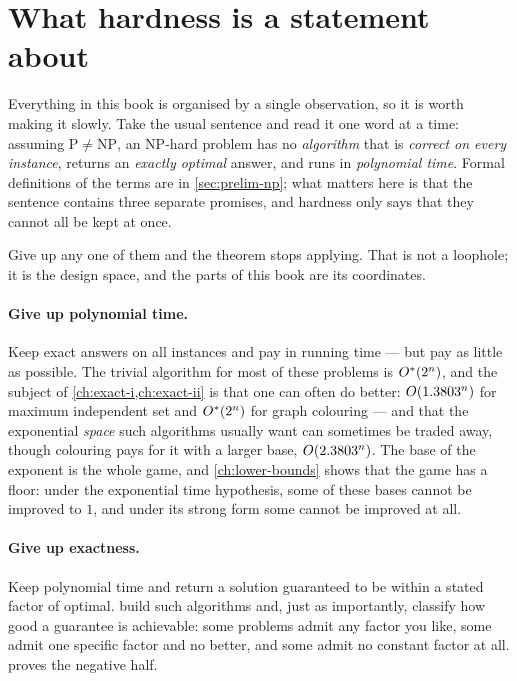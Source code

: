 \section{What hardness is a statement about}
\label{sec:intro-hardness}

Everything in this book is organised by a single observation, so it is worth
making it slowly. Take the usual sentence and read it one word at a time:
assuming $\mathrm{P} \ne \mathrm{NP}$, an \textrm{NP}-hard problem has no
\emph{algorithm} that is \emph{correct on every instance}, returns an
\emph{exactly optimal} answer, and runs in \emph{polynomial time}. Formal
definitions of the terms are in \cref{sec:prelim-np}; what matters here is that
the sentence contains three separate promises, and hardness only says that they
cannot all be kept at once.

Give up any one of them and the theorem stops applying. That is not a loophole;
it is the design space, and the parts of this book are its coordinates.

\paragraph{Give up polynomial time.} Keep exact answers on all instances and pay
in running time --- but pay as little as possible. The trivial algorithm for
most of these problems is $O^{*}(2^n)$, and the subject of
\cref{ch:exact-i,ch:exact-ii} is that one can often do better: $O\!\left(1.3803^n\right)$
for maximum independent set and $O^{*}(2^n)$ for graph colouring --- and that
the exponential \emph{space} such algorithms usually want can sometimes be
traded away, though colouring pays for it with a larger base,
$O\!\left(2.3803^n\right)$. The base of the exponent is the whole game, and
\cref{ch:lower-bounds} shows that the game has a floor: under the exponential
time hypothesis, some of these bases cannot be improved to $1$, and under its
strong form some cannot be improved at all.

\paragraph{Give up exactness.} Keep polynomial time and return a solution
guaranteed to be within a stated factor of optimal.
 build such algorithms and, just as importantly,
classify how good a guarantee is achievable: some problems admit any factor you
like, some admit one specific factor and no better, and some admit no constant
factor at all.  proves the negative half.

